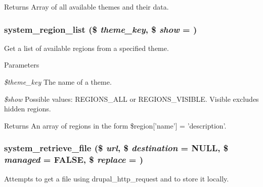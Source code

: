 \begin{DoxyReturn}{Returns}
Array of all available themes and their data. 
\end{DoxyReturn}
\hypertarget{system_8module_a83141ec3e67f121c72317be0c674dfe6}{
\subsubsection[{system\_\-region\_\-list}]{\setlength{\rightskip}{0pt plus 5cm}system\_\-region\_\-list (\$ {\em theme\_\-key}, \/  \$ {\em show} = {})}}
\label{system_8module_a83141ec3e67f121c72317be0c674dfe6}
Get a list of available regions from a specified theme.


\begin{DoxyParams}{Parameters}
\item[{\em \$theme\_\-key}]The name of a theme. \item[{\em \$show}]Possible values: REGIONS\_\-ALL or REGIONS\_\-VISIBLE. Visible excludes hidden regions. \end{DoxyParams}
\begin{DoxyReturn}{Returns}
An array of regions in the form \$region\mbox{[}'name'\mbox{]} = 'description'. 
\end{DoxyReturn}
\hypertarget{system_8module_a74479d43f0e63d771db29609879844b7}{
\subsubsection[{system\_\-retrieve\_\-file}]{\setlength{\rightskip}{0pt plus 5cm}system\_\-retrieve\_\-file (\$ {\em url}, \/  \$ {\em destination} = {\ttfamily NULL}, \/  \$ {\em managed} = {\ttfamily FALSE}, \/  \$ {\em replace} = {})}}
\label{system_8module_a74479d43f0e63d771db29609879844b7}
Attempts to get a file using drupal\_\-http\_\-request and to store it locally.


